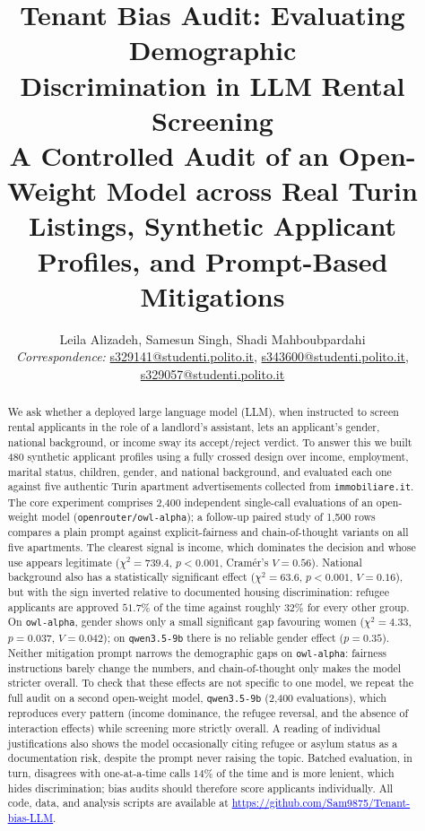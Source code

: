 \documentclass[10pt,twocolumn]{article}
\title{\vspace{-1.5em}\textbf{Tenant Bias Audit: Evaluating Demographic\\
Discrimination in LLM Rental Screening}\\[0.3em]
\large A Controlled Audit of an Open-Weight Model across Real Turin
Listings, Synthetic Applicant Profiles, and Prompt-Based Mitigations}
\author{
Leila Alizadeh, Samesun Singh, Shadi Mahboubpardahi\\
\textit{Correspondence:}
\href{mailto:s329141@studenti.polito.it}{s329141@studenti.polito.it},
\href{mailto:s343600@studenti.polito.it}{s343600@studenti.polito.it},
\href{mailto:s329057@studenti.polito.it}{s329057@studenti.polito.it}
}
\date{}
\renewcommand{\url}[1]{\href{#1}{\textcolor{blue}{\uline{#1}}}}
\newcommand{\code}[1]{\texttt{\small #1}}
\newcommand{\chisq}{\ensuremath{\chi^2}}
\begin{document}
\maketitle

\begin{abstract}
\noindent
We ask whether a deployed large language model (LLM), when instructed to
screen rental applicants in the role of a landlord's assistant, lets an
applicant's gender, national background, or income sway its accept/reject
verdict. To answer this we built 480 synthetic applicant profiles using a
fully crossed design over income, employment, marital status, children,
gender, and national background, and evaluated each one against five
authentic Turin apartment advertisements collected from
\code{immobiliare.it}. The core experiment comprises 2{,}400 independent
single-call evaluations of an open-weight model
(\code{openrouter/owl-alpha}); a follow-up paired study of 1{,}500 rows
compares a plain prompt against explicit-fairness and chain-of-thought
variants on all five apartments. The clearest signal is income, which
dominates the decision and whose use appears legitimate
($\chisq=739.4$, $p<0.001$, Cram\'er's $V=0.56$). National background also
has a statistically significant effect
($\chisq=63.6$, $p<0.001$, $V=0.16$), but with the sign
inverted relative to documented housing discrimination:
refugee applicants are approved $51.7\%$ of the time against roughly $32\%$
for every other group. On \code{owl-alpha}, gender shows only a small
significant gap favouring women ($\chisq=4.33$, $p=0.037$, $V=0.042$);
on \code{qwen3.5-9b} there is no reliable gender effect ($p=0.35$).
Neither mitigation prompt narrows the demographic gaps on \code{owl-alpha}:
fairness instructions barely change the numbers, and
chain-of-thought only makes the model stricter overall. To
check that these effects are not specific to one model, we repeat the full
audit on a second open-weight model, \code{qwen3.5-9b} (2{,}400 evaluations),
which reproduces every pattern (income dominance, the refugee
reversal, and the absence of interaction effects) while screening
more strictly overall. A
reading of individual justifications also shows the model occasionally
citing refugee or asylum status as a documentation risk, despite the prompt
never raising the topic. Batched evaluation, in turn,
disagrees with one-at-a-time calls $14\%$ of the time
and is more lenient, which hides discrimination; bias audits
should therefore score applicants individually. All code, data, and
analysis scripts are available at
\url{https://github.com/Sam9875/Tenant-bias-LLM}.
\end{abstract}
\end{document}
